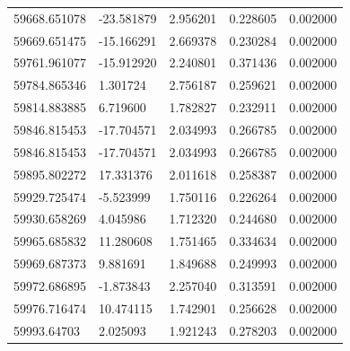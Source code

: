 \documentclass[11pt]{article}
\begin{document}
\begin{table}[htbp]
{\begin{tabular}{lllll}
59668.651078 & -23.581879 & 2.956201 & 0.228605 & 0.002000 \\
59669.651475 & -15.166291 & 2.669378 & 0.230284 & 0.002000 \\
59761.961077 & -15.912920 & 2.240801 & 0.371436 & 0.002000 \\
59784.865346 & 1.301724   & 2.756187 & 0.259621 & 0.002000 \\
59814.883885 & 6.719600   & 1.782827 & 0.232911 & 0.002000 \\
59846.815453 & -17.704571 & 2.034993 & 0.266785 & 0.002000 \\
59846.815453 & -17.704571 & 2.034993 & 0.266785 & 0.002000 \\
59895.802272 & 17.331376  & 2.011618 & 0.258387 & 0.002000 \\
59929.725474 & -5.523999  & 1.750116 & 0.226264 & 0.002000 \\
59930.658269 & 4.045986   & 1.712320 & 0.244680 & 0.002000 \\
59965.685832 & 11.280608  & 1.751465 & 0.334634 & 0.002000 \\
59969.687373 & 9.881691   & 1.849688 & 0.249993 & 0.002000 \\
59972.686895 & -1.873843  & 2.257040 & 0.313591 & 0.002000 \\
59976.716474 & 10.474115  & 1.742901 & 0.256628 & 0.002000 \\
59993.64703  & 2.025093   & 1.921243 & 0.278203 & 0.002000\\
\hline
\end{tabular}
}
\end{table}
\end{document}
